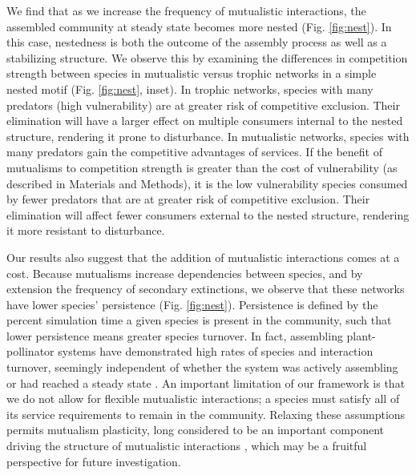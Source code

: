 \documentclass[9pt,twocolumn,twoside]{pnas-new}
\begin{document}
We find that as we increase the frequency of mutualistic interactions, the assembled community at steady state becomes more nested (Fig. \ref{fig:nest}).
In this case, nestedness is both the outcome of the assembly process as well as a stabilizing structure.
We observe this by examining the differences in competition strength between species in mutualistic versus trophic networks in a simple nested motif (Fig. \ref{fig:nest}, inset).
In trophic networks, species with many predators (high vulnerability) are at greater risk of competitive exclusion.
Their elimination will have a larger effect on multiple consumers internal to the nested structure, rendering it prone to disturbance.
In mutualistic networks, species with many predators gain the competitive advantages of services.
If the benefit of mutualisms to competition strength is greater than the cost of vulnerability (as described in Materials and Methods), it is the low vulnerability species consumed by fewer predators that are at greater risk of competitive exclusion.
Their elimination will affect fewer consumers external to the nested structure, rendering it more resistant to disturbance.


Our results also suggest that the addition of mutualistic interactions comes at a cost.
Because mutualisms increase dependencies between species, and by extension the frequency of secondary extinctions, we observe that these networks have lower species' persistence (Fig. \ref{fig:nest}). %
Persistence is defined by the percent simulation time a given species is present in the community, such that lower persistence means greater species turnover.
In fact, assembling plant-pollinator systems have demonstrated high rates of species and interaction turnover, seemingly independent of whether the system was actively assembling or had reached a steady state \cite{Ponisio2017}.
An important limitation of our framework is that we do not allow for flexible mutualistic interactions; a species must satisfy all of its service requirements to remain in the community.
Relaxing these assumptions permits mutualism plasticity, long considered to be an important component driving the structure of mutualistic interactions \cite{Ramos2012,Valdovinos2016,Ponisio2017,Valdovinos2019}, which may be a fruitful perspective for future investigation.\\
\end{document}
